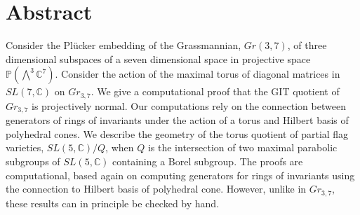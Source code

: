 \section{Abstract}\label{s.abstract}

Consider the Pl\"{u}cker embedding of the Grassmannian, $Gr(3,7)$, of three dimensional subspaces of a seven dimensional space in projective space ${\mathbb P}(\bigwedge^3 {\mathbb C}^7 )$. Consider the action of the maximal torus of diagonal matrices in $SL(7,{\mathbb C})$ on $Gr_{3,7}$. We give a computational proof that the GIT quotient of $Gr_{3,7}$  is projectively normal. Our computations rely on the connection between generators of rings of invariants under the action of a torus and Hilbert basis of polyhedral cones. 
We describe the geometry of the torus quotient of partial flag varieties, $SL(5,{\mathbb C})/Q$, when $Q$ is the 
intersection of two maximal parabolic subgroups of $SL(5,{\mathbb C})$ containing a Borel subgroup. The proofs are computational, based again on computing generators for rings of 
invariants using the connection to Hilbert basis of polyhedral cone. However, unlike in $Gr_{3,7}$, these results can in principle be checked by hand.